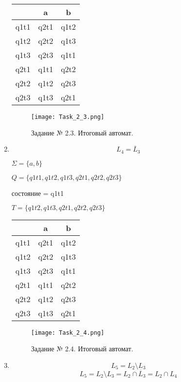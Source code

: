 \documentclass[a4paper, 12pt]{article}
\begin{document}
\begin{enumerate}
\begin{center}
\begin{tabular}{ |c|c|c| } 
\hline
\, & a & b \\
\hline
 q1t1 & q2t1 & q1t2 \\
\hline
q1t2 & q2t2 & q1t3 \\
\hline
q1t3 & q2t3 & q1t1 \\
\hline
q2t1 & q1t1 & q2t2 \\
\hline
q2t2 & q1t2 & q2t3 \\
\hline
q2t3 & q1t3 & q2t1 \\
\hline
\end{tabular}
\end{center}

\begin{figure}[!h]
\centering
\texttt{[image: Task\_2\_3.png]}
\caption{Задание № 2.3. Итоговый автомат.}
\end{figure}

\item$$ L_4 = \overline L_3 $$

\noindent$ \Sigma = \{a, b\}$

\noindent$ Q = \{q1t1, q1t2, q1t3, q2t1, q2t2, q2t3\} $

 состояние = q1t1

\noindent$ T = \{q1t2, q1t3, q2t1, q2t2, q2t3 \} $

\begin{center}
\begin{tabular}{ |c|c|c| } 
\hline
\, & a & b \\
\hline
 q1t1 & q2t1 & q1t2 \\
\hline
q1t2 & q2t2 & q1t3 \\
\hline
q1t3 & q2t3 & q1t1 \\
\hline
q2t1 & q1t1 & q2t2 \\
\hline
q2t2 & q1t2 & q2t3 \\
\hline
q2t3 & q1t3 & q2t1 \\
\hline
\end{tabular}
\end{center}

\begin{figure}[!h]
\centering
\texttt{[image: Task\_2\_4.png]}
\caption{Задание № 2.4. Итоговый автомат.}
\end{figure}

\item$$ L_5= L_2 \setminus L_3 $$
$$ L_5= L_2 \setminus L_3 = L_2 \cap \overline L_3 = L_2 \cap L_4 $$


\end{enumerate}
\end{document}
